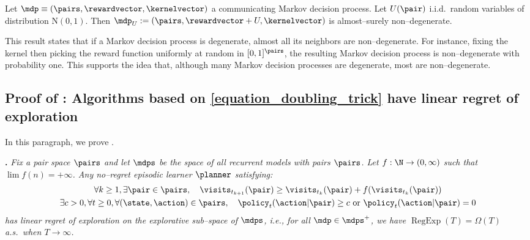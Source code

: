 \documentclass[preprint,cleveref,12pt]{colt2025}
\DeclarePairedDelimiter{\parens}{(}{)}	%
\def\model{\mdp}
\def\models{\mdps}
\def\kernel{\kernelvector}
\def\reward{\rewardvector}
\DeclareMathOperator{\RegExp}{\mathrm{RegExp}}
\newcommand{\strong}[1]{\textbf{#1}}
\begin{document}
    \begin{corollary}
    \label{corollary_non_degeneracy_noise}
        Let $\model \equiv (\pairs, \reward, \kernel)$ a communicating Markov decision process.
        Let $U(\pair)$ i.i.d.~random variables of distribution $\mathrm{N}(0, 1)$. 
        Then $\model_U := (\pairs, \reward + U, \kernel)$ is almost--surely non--degenerate.
    \end{corollary}
    
    This result states that if a Markov decision process is degenerate, almost all its neighbors are non--degenerate.
    For instance, fixing the kernel then picking the reward function uniformly at random in $[0, 1]^\pairs$, the resulting Markov decision process is non--degenerate with probability one. 
    This supports the idea that, although many Markov decision processes are degenerate, most are non--degenerate. 

    \subsection{Proof of : Algorithms based on \eqref{equation_doubling_trick} have linear regret of exploration}
    \label{appendix_proof_of_theorem_linear_regexp}

    In this paragraph, we prove .

    \bigskip
    \par\noindent
    \strong{.}
    \textit{
        Fix a pair space $\pairs$ and let $\models$ be the space of all recurrent models with pairs $\pairs$. 
        Let $f : \N \to (0, \infty)$ such that $\lim f(n) = + \infty$. 
        Any no--regret episodic learner $\planner$ satisfying:
        \begin{equation}
        \begin{gathered}
            \forall k \ge 1,
            \exists \pair \in \pairs,
            \quad
            \visits_{t_{k+1}}(\pair) \ge \visits_{t_k}(\pair) + f\parens*{\visits_{t_k}(\pair)}
            \\
            \exists c > 0,
            \forall t \ge 0, \forall (\state, \action) \in \pairs,
            \quad
            \policy_t(\action|\pair) \ge c \text{~or~} \policy_t(\action|\pair) = 0
        \end{gathered}
        \end{equation}
        has linear regret of exploration on the explorative sub--space of $\models$, i.e., for all $\model \in \models^+$, we have $\RegExp(T) = \Omega(T)$ a.s.~when $T \to \infty$.
    }
    \medskip
\end{document}
